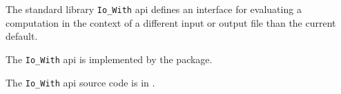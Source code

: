 
The standard library {\tt Io\_With} api defines an interface for evaluating 
a computation in the context of a different input or output file than the 
current default.

The {\tt Io\_With} api is implemented by the  package.

The {\tt Io\_With} api source code is in .



